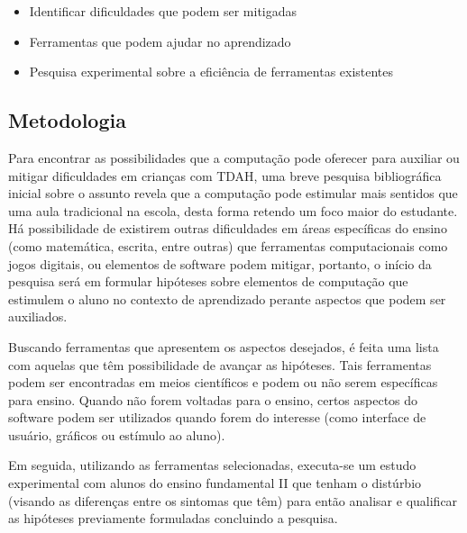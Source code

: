 \begin{itemize}
\item Identificar dificuldades que podem ser mitigadas
\item Ferramentas que podem ajudar no aprendizado
\item Pesquisa experimental sobre a eficiência de ferramentas existentes
\end{itemize}

\subsection{Metodologia}
Para encontrar as possibilidades que a computação pode oferecer para auxiliar ou mitigar dificuldades em crianças com TDAH, uma breve pesquisa bibliográfica inicial sobre o assunto revela que a computação pode estimular mais sentidos que uma aula tradicional na escola, desta forma retendo um foco maior do estudante. Há possibilidade de existirem outras dificuldades em áreas específicas do ensino (como matemática, escrita, entre outras) que ferramentas computacionais como jogos digitais, ou elementos de software podem mitigar, portanto, o início da pesquisa será em formular hipóteses sobre elementos de computação que estimulem o aluno no contexto de aprendizado perante aspectos que podem ser auxiliados.

Buscando ferramentas que apresentem os aspectos desejados, é feita uma lista com aquelas que têm possibilidade de avançar as hipóteses. Tais ferramentas podem ser encontradas em meios científicos e podem ou não serem específicas para ensino. Quando não forem voltadas para o ensino, certos aspectos do software podem ser utilizados quando forem do interesse (como interface de usuário, gráficos ou estímulo ao aluno).

Em seguida, utilizando as ferramentas selecionadas, executa-se um estudo experimental com alunos do ensino fundamental II que tenham o distúrbio (visando as diferenças entre os sintomas que têm) para então analisar e qualificar as hipóteses previamente formuladas concluindo a pesquisa.
